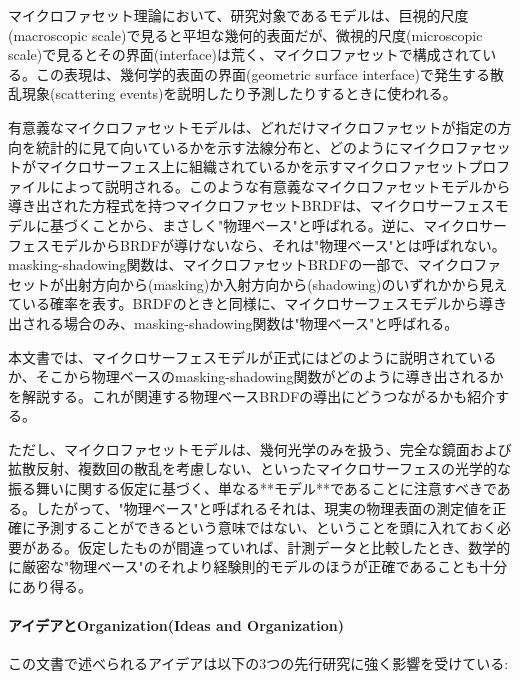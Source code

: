 \documentclass[a4j,xelatex,ja=standard]{bxjsarticle}
\begin{document}
マイクロファセット理論において、研究対象であるモデルは、巨視的尺度(macroscopic scale)で見ると平坦な幾何的表面だが、微視的尺度(microscopic scale)で見るとその界面(interface)は荒く、マイクロファセットで構成されている。この表現は、幾何学的表面の界面(geometric surface interface)で発生する散乱現象(scattering events)を説明したり予測したりするときに使われる。

有意義なマイクロファセットモデルは、どれだけマイクロファセットが指定の方向を統計的に見て向いているかを示す法線分布と、どのようにマイクロファセットがマイクロサーフェス上に組織されているかを示すマイクロファセットプロファイルによって説明される。このような有意義なマイクロファセットモデルから導き出された方程式を持つマイクロファセットBRDFは、マイクロサーフェスモデルに基づくことから、まさしく"物理ベース"と呼ばれる。逆に、マイクロサーフェスモデルからBRDFが導けないなら、それは"物理ベース"とは呼ばれない。masking-shadowing関数は、マイクロファセットBRDFの一部で、マイクロファセットが出射方向から(masking)か入射方向から(shadowing)のいずれかから見えている確率を表す。BRDFのときと同様に、マイクロサーフェスモデルから導き出される場合のみ、masking-shadowing関数は"物理ベース"と呼ばれる。

本文書では、マイクロサーフェスモデルが正式にはどのように説明されているか、そこから物理ベースのmasking-shadowing関数がどのように導き出されるかを解説する。これが関連する物理ベースBRDFの導出にどうつながるかも紹介する。

ただし、マイクロファセットモデルは、幾何光学のみを扱う、完全な鏡面および拡散反射、複数回の散乱を考慮しない、といったマイクロサーフェスの光学的な振る舞いに関する仮定に基づく、単なる**モデル**であることに注意すべきである。したがって、"物理ベース"と呼ばれるそれは、現実の物理表面の測定値を正確に予測することができるという意味ではない、ということを頭に入れておく必要がある。仮定したものが間違っていれば、計測データと比較したとき、数学的に厳密な"物理ベース"のそれより経験則的モデルのほうが正確であることも十分にあり得る。

\paragraph{アイデアとOrganization(Ideas and Organization)}

この文書で述べられるアイデアは以下の3つの先行研究に強く影響を受けている:
\end{document}
